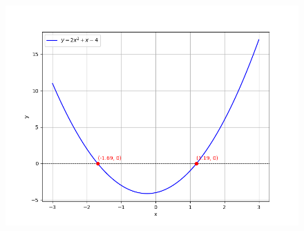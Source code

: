 \documentclass[journal]{IEEEtran}
\begin{document}
\begin{figure}[!ht]
    \centering
    \includegraphics[width=\columnwidth]{figs/Figure_1.png}
    \caption{}
\end{figure}
\end{document}
